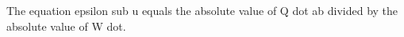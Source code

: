 The equation epsilon sub u equals the absolute value of Q dot ab divided by the absolute value of W dot.